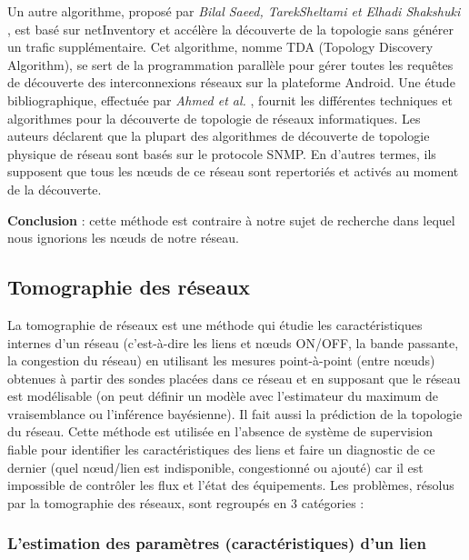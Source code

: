 \newline
Un autre algorithme, propos\'e par {\em Bilal Saeed, TarekSheltami et Elhadi Shakshuki} \cite{SAEED2015104}, est bas\'e sur netInventory et acc\'el\`ere la d\'ecouverte de la topologie sans g\'en\'erer un trafic suppl\'ementaire. Cet algorithme, nomme TDA (Topology Discovery Algorithm), se sert de la programmation parall\`ele pour g\'erer toutes les requ\^etes de d\'ecouverte des interconnexions r\'eseaux sur la plateforme Android.
Une \'etude bibliographique, effectu\'ee par {\em Ahmed et al.} \cite{AhmedRafatAbouchabaka2014}, fournit les diff\'erentes techniques et algorithmes pour la d\'ecouverte de topologie de r\'eseaux informatiques. Les auteurs d\'eclarent que la plupart des algorithmes de d\'ecouverte de topologie physique de r\'eseau sont bas\'es sur le protocole SNMP. En d'autres termes, ils supposent que tous les n\oe uds de ce r\'eseau sont repertori\'es et activ\'es au moment de la d\'ecouverte. 
\newline

{\bf Conclusion} :
cette m\'ethode est contraire \`a notre sujet de recherche dans lequel nous ignorions les n\oe uds de notre r\'eseau.

\subsection{Tomographie des r\'eseaux}
La tomographie de r\'eseaux est une m\'ethode qui \'etudie les caract\'eristiques internes d'un r\'eseau (c'est-\`a-dire les liens et n\oe uds ON/OFF, la bande passante, la congestion du r\'eseau) en utilisant les mesures point-\`a-point (entre n\oe uds) obtenues \`a partir des sondes plac\'ees dans ce r\'eseau et en supposant que le r\'eseau est mod\'elisable (on peut d\'efinir un mod\`ele avec l'estimateur du maximum de vraisemblance ou l'inf\'erence bay\'esienne). Il fait aussi la pr\'ediction de la topologie du r\'eseau.
\newline
Cette m\'ethode est utilis\'ee en l'absence de syst\`eme de supervision fiable pour identifier les caract\'eristiques des liens et faire un diagnostic de ce dernier (quel n\oe ud/lien est indisponible, congestionn\'e ou ajout\'e) car il est impossible de contr\^oler les flux et l'\'etat des \'equipements.
Les probl\`emes, r\'esolus par la tomographie des r\'eseaux,  sont regroup\'es en $3$ cat\'egories :

\subsubsection{L'estimation des param\`etres (caract\'eristiques) d'un lien}

